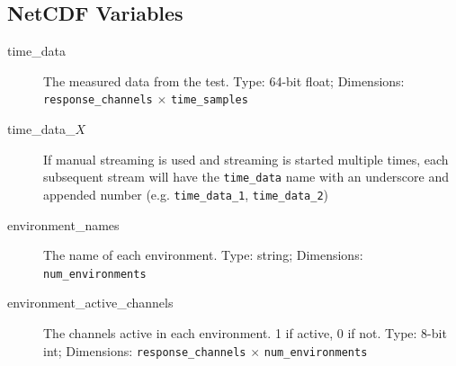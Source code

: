\documentclass[pdf,12pt,report]{SANDreport}
\newcommand{\inlineCode}{\lstinline[basicstyle=\bfseries\ttfamily]}
\begin{document}
    \subsection{NetCDF Variables}
    \begin{description}
        \item[time\_data] The measured data from the test. Type: 64-bit float; Dimensions: \inlineCode{response_channels} $\times$ \inlineCode{time_samples}
        \item[time\_data\_$X$] If manual streaming is used and streaming is started multiple times, each subsequent stream will have the \inlineCode{time_data} name with an underscore and appended number (e.g. \inlineCode{time_data_1}, \inlineCode{time_data_2})
        \item[environment\_names] The name of each environment. Type: string; Dimensions: \inlineCode{num_environments}
        \item[environment\_active\_channels] The channels active in each environment.  1 if active, 0 if not. Type: 8-bit int; Dimensions: \inlineCode{response_channels} $\times$ \inlineCode{num_environments}
    \end{description}
\end{document}

